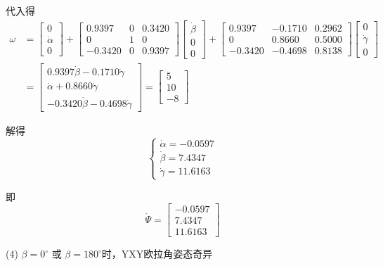 \documentclass[UTF8, 12pt]{ctexart}
\begin{document}
代入得
\[
\begin{aligned}
    \omega &=
        \begin{bmatrix}
            0 \\ \dot{\alpha} \\ 0
        \end{bmatrix}
        +
        \begin{bmatrix}
            0.9397 & 0 & 0.3420 \\
            0 & 1 & 0 \\
            -0.3420 & 0 & 0.9397
        \end{bmatrix}
        \begin{bmatrix}
            \dot{\beta} \\ 0 \\ 0
        \end{bmatrix}
        +
        \begin{bmatrix}
            0.9397 & -0.1710 & 0.2962 \\
            0 & 0.8660 & 0.5000 \\
            -0.3420 & -0.4698 & 0.8138
        \end{bmatrix}
        \begin{bmatrix}
            0 \\ \dot{\gamma} \\ 0
        \end{bmatrix} \\
        &= 
        \begin{bmatrix}
            0.9397\dot{\beta} - 0.1710\dot{\gamma} \\
            \dot{\alpha} + 0.8660\dot{\gamma} \\
            -0.3420\dot{\beta} - 0.4698\dot{\gamma}
        \end{bmatrix}
        = \begin{bmatrix}
            5 \\ 10 \\ -8
        \end{bmatrix}
\end{aligned}
\]

解得
\[
\begin{cases}
    \dot{\alpha} = -0.0597 \\
    \dot{\beta} = 7.4347 \\
    \dot{\gamma} = 11.6163
\end{cases}
\]

即
\[
\dot{\Psi} = \begin{bmatrix}
    -0.0597 \\ 7.4347 \\ 11.6163
\end{bmatrix}
\]
\vspace{5em}


(4)
\(\beta = 0^\circ \) 或 \(\beta = 180^\circ\)时，YXY欧拉角姿态奇异
\end{document}
